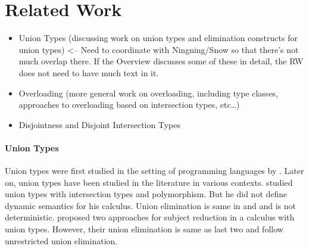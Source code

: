 \section{Related Work}
\label{sec:related}


\begin{itemize}
	\item {Union Types    (discussing work on union types and elimination constructs for union types) <-- Need to coordinate with Ningning/Snow so that there’s not much overlap there. If the Overview discusses some of these in detail, the RW does not need to have much text in it.}
	\item {Overloading (more general work on overloading, including type classes, approaches to overloading based on intersection types, etc…)}
	\item{Disjointness and Disjoint Intersection Types}
\end{itemize}

\paragraph{Union Types}
\begin{comment}
Set-theoretic unions have sound theory and extensively studied in
mathematics. Set-theoretic unions correspond to union types or
disjoint union types in programming languages. Disjoint union types
are also called sum types or variants.  Constructors are explicitly
labeled in disjoint union types and expressions are manipulated using
corresponding labels. Few other interesting calculi (and this paper)
do not use labels and provide type-based union elimination.
\end{comment}
Union types were first studied in the setting of programming languages
by \citet{macqueen1984ideal}. Later on, union types have been studied
in the literature in various contexts. \citep{pierce1991programming}
studied union types with intersection types and polymorphism. But he
did not define dynamic semantics for his calculus. Union elimination
is same in \citep{macqueen1984ideal} and \citep{pierce1991programming}
and is not deterministic.  \citet{barbanera1995intersection} proposed
two approaches for subject reduction in a calculus with union
types. However, their union elimination is same as last two and follow
unrestricted union elimination. 

